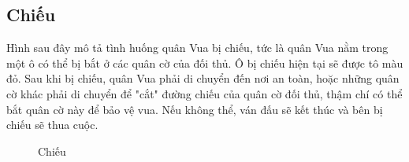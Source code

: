 \subsection{Chiếu}
Hình sau đây mô tả tình huống quân Vua bị chiếu, tức là quân Vua nằm trong một ô có thể bị bắt ở các quân cờ của đối thủ. Ô bị chiếu hiện tại sẽ được tô màu đỏ. Sau khi bị chiếu, quân Vua phải di chuyển đến nơi an toàn, hoặc những quân cờ khác phải di chuyển để "cắt" đường chiếu của quân cờ đối thủ, thậm chí có thể bắt quân cờ này để bảo vệ vua. Nếu không thể, ván đấu sẽ kết thúc và bên bị chiếu sẽ thua cuộc.
\begin{figure}[H]
\caption{Chiếu}
\end{figure}

